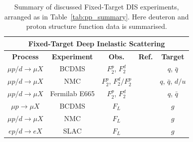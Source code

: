 \documentclass[12pt,oneside,openright]{report}
\begin{document}
\begin{spacing}{1.5}
\begin{table}
\label{tab:FTDIS_summary}
\begin{center}
\begin{tabular}{|c|c|c|c|c|}
\hline
\multicolumn{5}{|c|}{ \textbf{Fixed-Target Deep Inelastic Scattering} }\\
\hline
\textbf{Process} & \textbf{Experiment} & \textbf{Obs.}& \textbf{Ref.} &  \textbf{Target} \\
\hline\hline
$\mu p/d \to \mu X$ & BCDMS& $F_2^p$, $F_2^d$ &\cite{Benvenuti:1989rh,Benvenuti:1989fm} & $q$, $\bar{q}$\\
$\mu p/d \to \mu X$ & NMC &$F_2^p$, $F_2^d/F_2^p$ & \cite{Arneodo:1996kd,Arneodo:1996qe} & $q$, $\bar{q}$, $d/u$\\
$\mu p/d \to \mu X$ & Fermilab E665 & $F_2^p$, $F_2^d$ & \cite{Adams:1996gu} & $q$, $\bar{q}$\\
\hline
$\mu p \to \mu X$ & BCDMS &$F_L$ &\cite{Benvenuti:1989rh} & $g$ \\
$\mu p/d \to \mu X$ & NMC &$F_L$ & \cite{Arneodo:1996qe} & $g$\\
$e p/d \to e X$ & SLAC &$F_L$& \cite{Whitlow:1990gk} & $g$\\
\hline
\end{tabular}
\end{center}
\caption{Summary of discussed Fixed-Target DIS experiments, arranged as in Table~\ref{tab:pp_summary}. Here deuteron and proton structure function data is summarised.}
\end{table}%



\end{spacing}
\end{document}
